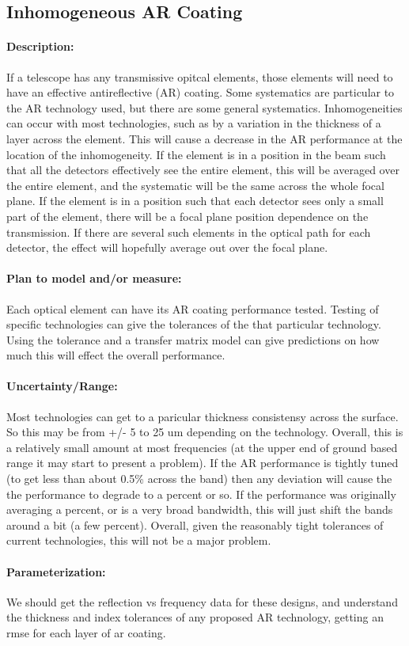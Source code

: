 \subsection{Inhomogeneous AR Coating}

\paragraph{Description:}
If a telescope has any transmissive opitcal elements, those elements will need to have an effective antireflective (AR) coating.  Some systematics are particular to the AR technology used, but there are some general systematics.  Inhomogeneities can occur with most technologies, such as by a variation in the thickness of a layer across the element.  This will cause a decrease in the AR performance at the location of the inhomogeneity.  If the element is in a position in the beam such that all the detectors effectively see the entire element, this will be averaged over the entire element, and the systematic will be the same across the whole focal plane.  If the element is in a position such that each detector sees only a small part of the element, there will be a focal plane position dependence on the transmission.  If there are several such elements in the optical path for each detector, the effect will hopefully average out over the focal plane.

\paragraph{Plan to model and/or measure:}
Each optical element can have its AR coating performance tested.  Testing of specific technologies can give the tolerances of the that particular technology.  Using the tolerance and a transfer matrix model can give predictions on how much this will effect the overall performance. 

\paragraph{Uncertainty/Range:}
Most technologies can get to a paricular thickness consistensy across the surface.  So this may be from +/- 5 to 25 um depending on the technology.  Overall, this is a relatively small amount at most frequencies (at the upper end of ground based range it may start to present a problem).  If the AR performance is tightly tuned (to get less than about 0.5\% across the band) then any deviation  will cause the the performance to degrade to a percent or so.  If the performance was originally averaging a percent, or is a very broad bandwidth, this will just shift the bands around a bit (a few percent).  Overall, given the reasonably tight tolerances of current technologies, this will not be a major problem.

\paragraph{Parameterization:}
We should get the reflection vs frequency data for these designs, and understand the thickness and index tolerances of any proposed AR technology, getting an rmse for each layer of ar coating.
